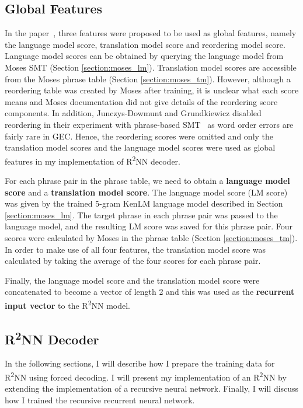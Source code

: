 \documentclass[12pt,a4paper,twoside]{report}
\begin{document}
\subsection{Global Features} \label{section:global_features}
In the paper~\cite{r2nn}, three features were proposed to be used as global features, namely the language model score, translation model score and reordering model score. Language model scores can be obtained by querying the language model from Moses SMT (Section \ref{section:moses_lm}). Translation model scores are accessible from the Moses phrase table (Section \ref{section:moses_tm}). However, although a reordering table was created by Moses after training, it is unclear what each score means and Moses documentation did not give details of the reordering score components. In addition, Junczys-Dowmunt and Grundkiewicz disabled reordering in their experiment with phrase-based SMT~\cite{junczys-dowmunt-grundkiewicz-2016-phrase} as word order errors are fairly rare in GEC. Hence, the reordering scores were omitted and only the translation model scores and the language model scores were used as global features in my implementation of R\textsuperscript{2}NN decoder.

For each phrase pair in the phrase table, we need to obtain a \textbf{language model score} and a \textbf{translation model score}. The language model score (LM score) was given by the trained 5-gram KenLM language model described in Section \ref{section:moses_lm}. The target phrase in each phrase pair was passed to the language model, and the resulting LM score was saved for this phrase pair. Four scores were calculated by Moses in the phrase table (Section \ref{section:moses_tm}). In order to make use of all four features, the translation model score was calculated by taking the average of the four scores for each phrase pair.

Finally, the language model score and the translation model score were concatenated to become a vector of length 2 and this was used as the \textbf{recurrent input vector} to the R\textsuperscript{2}NN model.

\subsection{\texorpdfstring{R\textsuperscript{2}NN}{R2NN} Decoder} \label{section:r2nn_model}
In the following sections, I will describe how I prepare the training data for R\textsuperscript{2}NN using forced decoding. I will present my implementation of an R\textsuperscript{2}NN by extending the implementation of a recursive neural network. Finally, I will discuss how I trained the recursive recurrent neural network.
\end{document}
